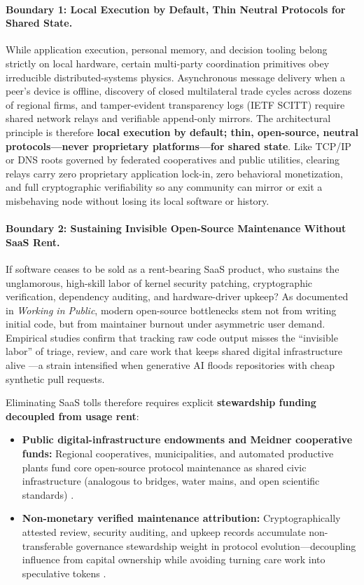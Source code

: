 \documentclass[11pt]{article}
\begin{document}
\paragraph{Boundary 1: Local Execution by Default, Thin Neutral Protocols for Shared State.}
While application execution, personal memory, and decision tooling belong strictly on local hardware, certain multi-party coordination primitives obey irreducible distributed-systems physics. Asynchronous message delivery when a peer's device is offline, discovery of closed multilateral trade cycles across dozens of regional firms, and tamper-evident transparency logs (IETF SCITT) require shared network relays and verifiable append-only mirrors. The architectural principle is therefore \textbf{local execution by default; thin, open-source, neutral protocols---never proprietary platforms---for shared state}. Like TCP/IP or DNS roots governed by federated cooperatives and public utilities, clearing relays carry zero proprietary application lock-in, zero behavioral monetization, and full cryptographic verifiability so any community can mirror or exit a misbehaving node without losing its local software or history.

\paragraph{Boundary 2: Sustaining Invisible Open-Source Maintenance Without SaaS Rent.}
If software ceases to be sold as a rent-bearing SaaS product, who sustains the unglamorous, high-skill labor of kernel security patching, cryptographic verification, dependency auditing, and hardware-driver upkeep? As \citet{eghbal2020working} documented in \emph{Working in Public}, modern open-source bottlenecks stem not from writing initial code, but from maintainer burnout under asymmetric user demand. Empirical studies confirm that tracking raw code output misses the ``invisible labor'' of triage, review, and care work that keeps shared digital infrastructure alive \citep{meluso2024invisible}---a strain intensified when generative AI floods repositories with cheap synthetic pull requests.

Eliminating SaaS tolls therefore requires explicit \textbf{stewardship funding decoupled from usage rent}:
\begin{itemize}
  \item \textbf{Public digital-infrastructure endowments and Meidner cooperative funds:} Regional cooperatives, municipalities, and automated productive plants fund core open-source protocol maintenance as shared civic infrastructure (analogous to bridges, water mains, and open scientific standards) \citep{meidner1978funds}.
  \item \textbf{Non-monetary verified maintenance attribution:} Cryptographically attested review, security auditing, and upkeep records accumulate non-transferable governance stewardship weight in protocol evolution---decoupling influence from capital ownership while avoiding turning care work into speculative tokens \citep{deci1999rewards}.
\end{itemize}
\end{document}
